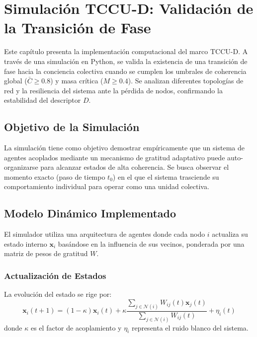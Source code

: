 \chapter{Simulación TCCU-D: Validación de la Transición de Fase}
\label{chap:simulacion_tccu_d}

\begin{resumen}
Este capítulo presenta la implementación computacional del marco TCCU-D. A través de una simulación en Python, se valida la existencia de una transición de fase hacia la conciencia colectiva cuando se cumplen los umbrales de coherencia global ($\bar{C} \ge 0.8$) y masa crítica ($M \ge 0.4$). Se analizan diferentes topologías de red y la resiliencia del sistema ante la pérdida de nodos, confirmando la estabilidad del descriptor $D$.
\end{resumen}

\section{Objetivo de la Simulación}
La simulación tiene como objetivo demostrar empíricamente que un sistema de agentes acoplados mediante un mecanismo de gratitud adaptativo puede auto-organizarse para alcanzar estados de alta coherencia. Se busca observar el momento exacto (paso de tiempo $t_0$) en el que el sistema trasciende su comportamiento individual para operar como una unidad colectiva.

\section{Modelo Dinámico Implementado}
El simulador utiliza una arquitectura de agentes donde cada nodo $i$ actualiza su estado interno $\mathbf{x}_i$ basándose en la influencia de sus vecinos, ponderada por una matriz de pesos de gratitud $W$.

\subsection{Actualización de Estados}
La evolución del estado se rige por:
\begin{equation}
\mathbf{x}_i(t+1) = (1 - \kappa) \mathbf{x}_i(t) + \kappa \frac{\sum_{j \in \mathcal{N}(i)} W_{ij}(t) \mathbf{x}_j(t)}{\sum_{j \in \mathcal{N}(i)} W_{ij}(t)} + \eta_i(t)
\end{equation}
donde $\kappa$ es el factor de acoplamiento y $\eta_i$ representa el ruido blanco del sistema.


